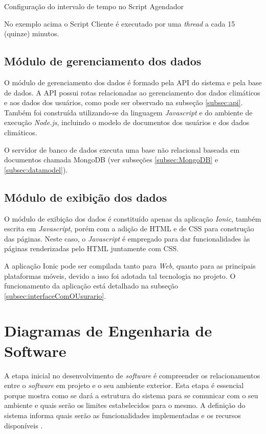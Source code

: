 Configuração do intervalo de tempo no Script Agendador


No exemplo acima o Script Cliente é executado por uma \textit{thread} a cada 15 (quinze) minutos.

\subsection{Módulo de gerenciamento dos dados}

O módulo de gerenciamento dos dados é formado pela API do sistema e pela base de dados. A API possui rotas relacionadas ao gerenciamento dos dados climáticos e aos dados dos usuários, como pode ser observado na subseção \ref{subsec:api}. Também foi construída utilizando-se da linguagem \textit{Javascript} e do ambiente de execução \textit{Node.js}, incluindo o modelo de documentos dos usuários e dos dados climáticos.
 
O servidor de banco de dados executa uma base não relacional baseada em documentos chamada MongoDB (ver subseções \ref{subsec:MongoDB} e \ref{subsec:datamodel}).

 \subsection{Módulo de exibição dos dados}

O módulo de exibição dos dados é constituído apenas da aplicação \textit{Ionic}, também escrita em \textit{Javascript}, porém com a adição de HTML e de CSS para construção das páginas. Neste caso, o \textit{Javascript} é empregado para dar funcionalidades às páginas renderizadas pelo HTML juntamente com CSS.

A aplicação Ionic pode ser compilada tanto para \textit{Web}, quanto para as principais plataformas móveis, devido a isso foi adotada tal tecnologia no projeto. O funcionamento da aplicação está detalhado na subseção \ref{subsec:interfaceComOUsurario}.


\section{Diagramas de Engenharia de Software} \label{sec:diagramas}
A etapa inicial no desenvolvimento de \textit{software} é compreender os relacionamentos entre o \textit{software} em projeto e o seu ambiente exterior. Esta etapa é essencial porque mostra como se dará a estrutura do sistema para se comunicar com o seu ambiente e quais serão os limites estabelecidos para o mesmo. A definição do sistema informa quais serão as funcionalidades implementadas e os recursos disponíveis \cite{sommerville2011engenharia}.

